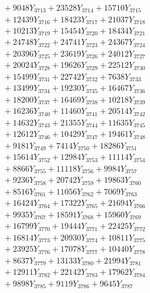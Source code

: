 \documentclass[a4paper,10pt]{article}
\begin{document}
{\begin{align}
&\;  + 9048 Y_{3713} + 23528 Y_{3714} + 15710 Y_{3715} \\[0.3ex]
&\;  + 12439 Y_{3716} + 18423 Y_{3717} + 21037 Y_{3718} \\[0.5ex]\allowbreak
&\;  + 10213 Y_{3719} + 15454 Y_{3720} + 18434 Y_{3721} \\[0.3ex]
&\;  + 24748 Y_{3722} + 24741 Y_{3723} + 24367 Y_{3724} \\[0.3ex]
&\;  + 20396 Y_{3725} + 23619 Y_{3726} + 24012 Y_{3727} \\[0.3ex]
&\;  + 20024 Y_{3728} + 19626 Y_{3729} + 22512 Y_{3730} \\[0.3ex]
&\;  + 15499 Y_{3731} + 22742 Y_{3732} + 7638 Y_{3733} \\[0.3ex]
&\;  + 13499 Y_{3734} + 19230 Y_{3735} + 16467 Y_{3736} \\[0.3ex]
&\;  + 18200 Y_{3737} + 16469 Y_{3738} + 10218 Y_{3739} \\[0.3ex]
&\;  + 16236 Y_{3740} + 11460 Y_{3741} + 20514 Y_{3742} \\[0.3ex]
&\;  + 14632 Y_{3743} + 21355 Y_{3744} + 11635 Y_{3745} \\[0.3ex]
&\;  + 12612 Y_{3746} + 10429 Y_{3747} + 19461 Y_{3748} \\[0.5ex]\allowbreak
&\;  + 9181 Y_{3749} + 7414 Y_{3750} + 18286 Y_{3751} \\[0.3ex]
&\;  + 15614 Y_{3752} + 12984 Y_{3753} + 11114 Y_{3754} \\[0.3ex]
&\;  + 8866 Y_{3755} + 11118 Y_{3756} + 9984 Y_{3757} \\[0.3ex]
&\;  + 9236 Y_{3758} + 20742 Y_{3759} + 19863 Y_{3760} \\[0.3ex]
&\;  + 8516 Y_{3761} + 11056 Y_{3762} + 7069 Y_{3763} \\[0.3ex]
&\;  + 16424 Y_{3764} + 17322 Y_{3765} + 21694 Y_{3766} \\[0.3ex]
&\;  + 9935 Y_{3767} + 18591 Y_{3768} + 15960 Y_{3769} \\[0.3ex]
&\;  + 16799 Y_{3770} + 19444 Y_{3771} + 22425 Y_{3772} \\[0.3ex]
&\;  + 16814 Y_{3773} + 20930 Y_{3774} + 10811 Y_{3775} \\[0.3ex]
&\;  + 23925 Y_{3776} + 17078 Y_{3777} + 10440 Y_{3778} \\[0.5ex]\allowbreak
&\;  + 8637 Y_{3779} + 13133 Y_{3780} + 21994 Y_{3781} \\[0.3ex]
&\;  + 12911 Y_{3782} + 22142 Y_{3783} + 17962 Y_{3784} \\[0.3ex]
&\;  + 9898 Y_{3785} + 9119 Y_{3786} + 9645 Y_{3787} \\[0.3ex]

\end{align}}
\end{document}
